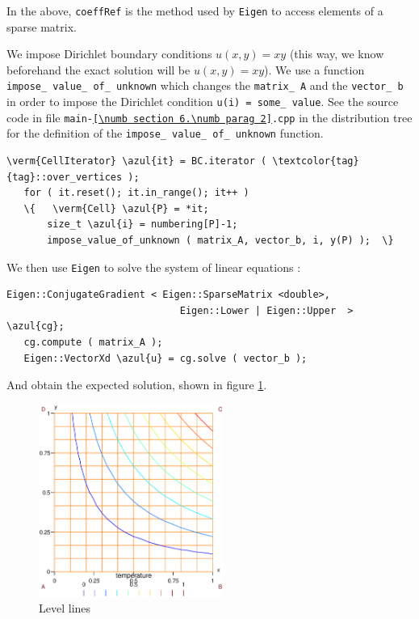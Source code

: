 In the above, {\small\tt coeffRef} is the method used by {\small\tt Eigen} to access elements of
a sparse matrix.

We impose Dirichlet boundary conditions $ u(x,y) = xy $ (this way, we know beforehand
the exact solution will be $ u(x,y) = xy $).
We use a function {\small\tt impose\_\,value\_\,of\_\,unknown} which changes the {\small\tt matrix\_\,A}
and the {\small\tt vector\_\,b} in order to impose the Dirichlet condition {\small\tt u(i) = 
some\_\,value}.
See the source code in file {\small\tt main-\ref{\numb section 6.\numb parag 2}.cpp}
in the distribution tree for the definition of the {\small\tt impose\_\,value\_\,of\_\,unknown}
function.

\begin{Verbatim}[commandchars=\\\{\},formatcom=\small\tt,frame=single,
   label=parag-\ref{\numb section 6.\numb parag 2}.cpp,rulecolor=\color{coment},
   baselinestretch=0.94,framesep=2mm                                            ]
   \verm{CellIterator} \azul{it} = BC.iterator ( \textcolor{tag}{tag}::over_vertices );
   for ( it.reset(); it.in_range(); it++ )
   \{   \verm{Cell} \azul{P} = *it;
       size_t \azul{i} = numbering[P]-1;
       impose_value_of_unknown ( matrix_A, vector_b, i, y(P) );  \}
\end{Verbatim}

We then use {\small\tt Eigen} to solve the system of linear equations :

\begin{Verbatim}[commandchars=\\\{\},formatcom=\small\tt,frame=single,
   label=parag-\ref{\numb section 6.\numb parag 2}.cpp,rulecolor=\color{coment},
   baselinestretch=0.94,framesep=2mm                                            ]
   Eigen::ConjugateGradient < Eigen::SparseMatrix <double>,
                              Eigen::Lower | Eigen::Upper  > \azul{cg};
   cg.compute ( matrix_A );
   Eigen::VectorXd \azul{u} = cg.solve ( vector_b );
\end{Verbatim}

And obtain the expected solution, shown in figure \ref{\numb section 6.\numb fig 1}.

\begin{figure} \centering
  \includegraphics[width=60mm]{square-Dirichlet}
  \caption{Level lines}
  \label{\numb section 6.\numb fig 1}
\end{figure}

